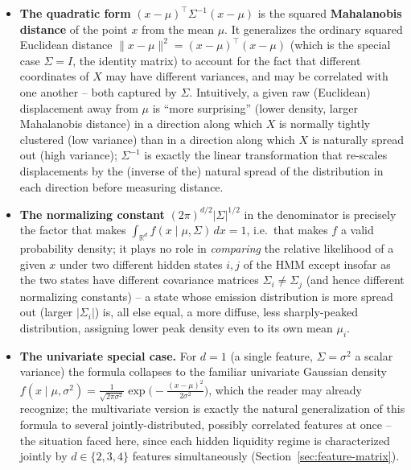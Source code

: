 \documentclass[11pt]{article}
\theoremstyle{definition}
\theoremstyle{remark}
\begin{document}
\begin{itemize}
    \item \textbf{The quadratic form} $(x-\mu)^\top\Sigma^{-1}(x-\mu)$ is the squared \textbf{Mahalanobis distance} of the point $x$ from the mean $\mu$. It generalizes the ordinary squared Euclidean distance $\|x-\mu\|^2=(x-\mu)^\top(x-\mu)$ (which is the special case $\Sigma=I$, the identity matrix) to account for the fact that different coordinates of $X$ may have different variances, and may be correlated with one another -- both captured by $\Sigma$. Intuitively, a given raw (Euclidean) displacement away from $\mu$ is ``more surprising'' (lower density, larger Mahalanobis distance) in a direction along which $X$ is normally tightly clustered (low variance) than in a direction along which $X$ is naturally spread out (high variance); $\Sigma^{-1}$ is exactly the linear transformation that re-scales displacements by the (inverse of the) natural spread of the distribution in each direction before measuring distance.
    \item \textbf{The normalizing constant} $(2\pi)^{d/2}|\Sigma|^{1/2}$ in the denominator is precisely the factor that makes $\int_{\mathbb{R}^d}f(x\mid\mu,\Sigma)\,dx=1$, i.e.\ that makes $f$ a valid probability density; it plays no role in \emph{comparing} the relative likelihood of a given $x$ under two different hidden states $i,j$ of the HMM except insofar as the two states have different covariance matrices $\Sigma_i\ne\Sigma_j$ (and hence different normalizing constants) -- a state whose emission distribution is more spread out (larger $|\Sigma_i|$) is, all else equal, a more diffuse, less sharply-peaked distribution, assigning lower peak density even to its own mean $\mu_i$.
    \item \textbf{The univariate special case.} For $d=1$ (a single feature, $\Sigma=\sigma^2$ a scalar variance) the formula collapses to the familiar univariate Gaussian density $f(x\mid\mu,\sigma^2)=\frac{1}{\sqrt{2\pi\sigma^2}}\exp\!\big(-\tfrac{(x-\mu)^2}{2\sigma^2}\big)$, which the reader may already recognize; the multivariate version is exactly the natural generalization of this formula to several jointly-distributed, possibly correlated features at once -- the situation faced here, since each hidden liquidity regime is characterized jointly by $d\in\{2,3,4\}$ features simultaneously (Section~\ref{sec:feature-matrix}).
\end{itemize}

\end{document}
